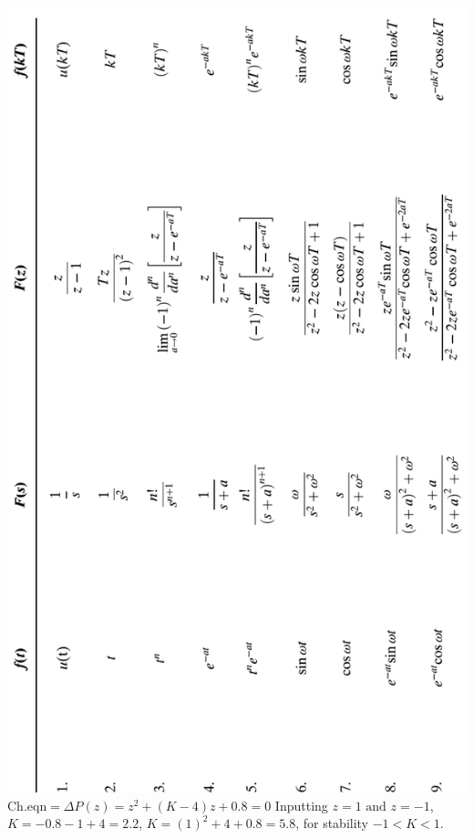 \begin{multicols}{3}
\includegraphics[width=1\linewidth]{NICEPictureRotate.png}
$\text{Ch.eqn} =\Delta P(z)=z^2+(K-4)z+0.8=0$ \newline
Inputting $z=1 \text{ and } z=-1$, $K=-0.8-1+4=2.2$, $K=(1)^2+4+0.8=5.8$, for stability $-1<K<1$.

\end{multicols}
